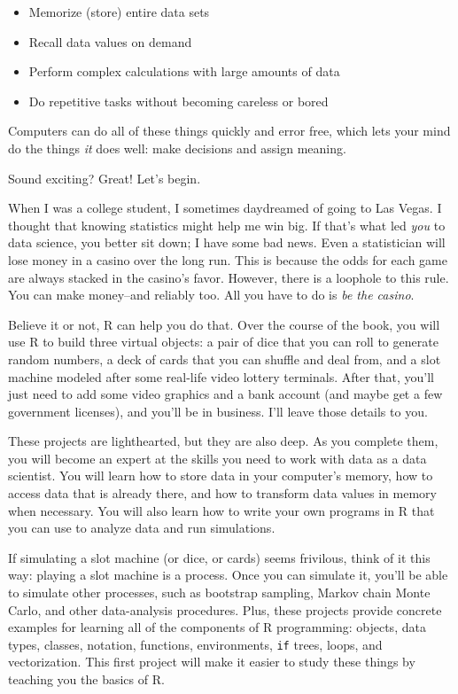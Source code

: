 \documentclass[
  letterpaper,
  DIV=11,
  numbers=noendperiod]{scrbook}
\providecommand{\tightlist}{%
  \setlength{\itemsep}{0pt}\setlength{\parskip}{0pt}}
\begin{document}
\begin{itemize}
\tightlist
\item
  Memorize (store) entire data sets
\item
  Recall data values on demand
\item
  Perform complex calculations with large amounts of data
\item
  Do repetitive tasks without becoming careless or bored
\end{itemize}

Computers can do all of these things quickly and error free, which lets
your mind do the things \emph{it} does well: make decisions and assign
meaning.

Sound exciting? Great! Let's begin.

When I was a college student, I sometimes daydreamed of going to Las
Vegas. I thought that knowing statistics might help me win big. If
that's what led \emph{you} to data science, you better sit down; I have
some bad news. Even a statistician will lose money in a casino over the
long run. This is because the odds for each game are always stacked in
the casino's favor. However, there is a loophole to this rule. You can
make money--and reliably too. All you have to do is \emph{be the
casino}.

Believe it or not, R can help you do that. Over the course of the book,
you will use R to build three virtual objects: a pair of dice that you
can roll to generate random numbers, a deck of cards that you can
shuffle and deal from, and a slot machine modeled after some real-life
video lottery terminals. After that, you'll just need to add some video
graphics and a bank account (and maybe get a few government licenses),
and you'll be in business. I'll leave those details to you.

These projects are lighthearted, but they are also deep. As you complete
them, you will become an expert at the skills you need to work with data
as a data scientist. You will learn how to store data in your computer's
memory, how to access data that is already there, and how to transform
data values in memory when necessary. You will also learn how to write
your own programs in R that you can use to analyze data and run
simulations.

If simulating a slot machine (or dice, or cards) seems frivilous, think
of it this way: playing a slot machine is a process. Once you can
simulate it, you'll be able to simulate other processes, such as
bootstrap sampling, Markov chain Monte Carlo, and other data-analysis
procedures. Plus, these projects provide concrete examples for learning
all of the components of R programming: objects, data types, classes,
notation, functions, environments, \texttt{if} trees, loops, and
vectorization. This first project will make it easier to study these
things by teaching you the basics of R.
\end{document}
